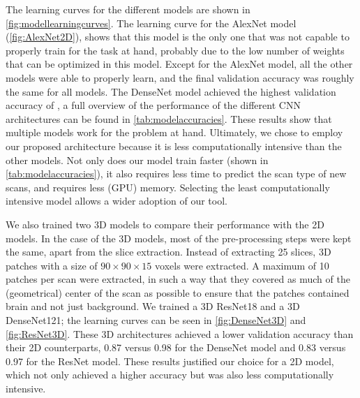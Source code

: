 \begin{subappendices}
The learning curves for the different models are shown in \cref{fig:modellearningcurves}.
The learning curve for the AlexNet model (\cref{fig:AlexNet2D}), shows that this model is the only one that was not capable to properly train for the task at hand, probably due to the low number of weights that can be optimized in this model.
Except for the AlexNet model, all the other models were able to properly learn, and the final validation accuracy was roughly the same for all models.
The DenseNet model achieved the highest validation accuracy of , a full overview of the performance of the different \gls{CNN} architectures can be found in \cref{tab:modelaccuracies}.
These results show that multiple models work for the problem at hand.
Ultimately, we chose to employ our proposed architecture because it is less computationally intensive than the other models.
Not only does our model train faster (shown in \cref{tab:modelaccuracies}), it also requires less time to predict the scan type of new scans, and requires less (GPU) memory.
Selecting the least computationally intensive model allows a wider adoption of our tool.

We also trained two 3D models to compare their performance with the 2D models.
In the case of the 3D models, most of the pre-processing steps were kept the same, apart from the \gls{slice} extraction.
Instead of extracting 25 \glspl{slice}, 3D patches with a size of $90\times90\times15$ voxels were extracted.
A maximum of 10 patches per \gls{scan} were extracted, in such a way that they covered as much of the (geometrical) center of the \gls{scan} as possible to ensure that the patches contained brain and not just background.
We trained a 3D ResNet18 and a 3D DenseNet121; the learning curves can be seen in \cref{fig:DenseNet3D} and \cref{fig:ResNet3D}.
These 3D architectures achieved a lower validation accuracy than their 2D counterparts, 0.87 versus 0.98 for the DenseNet model and 0.83 versus 0.97 for the ResNet model.
These results justified our choice for a 2D model, which not only achieved a higher accuracy but was also less computationally intensive.


\begin{figure}
\centering

\newlength{\modelplotwidth}
\setlength{\modelplotwidth}{0.23\textwidth}


\end{figure}
\end{subappendices}
